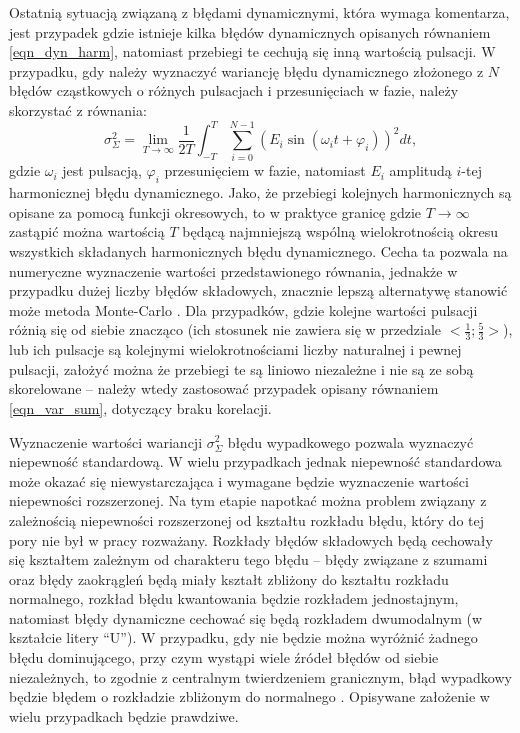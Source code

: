 Ostatnią sytuacją związaną z błędami dynamicznymi, która wymaga komentarza, jest przypadek gdzie istnieje kilka błędów dynamicznych opisanych równaniem \eqref{eqn_dyn_harm}, natomiast przebiegi te cechują się inną wartością pulsacji. W przypadku, gdy należy wyznaczyć wariancję błędu dynamicznego złożonego z $N$ błędów cząstkowych o różnych pulsacjach i przesunięciach w fazie, należy skorzystać z równania:
\begin{equation}
\sigma_{\Sigma}^{2} = \lim _{T \to \infty} \frac{1}{2T} \int _{-T} ^{T} \sum _{i = 0} ^{N -1} \left( E_{i} \sin(\omega_{i} t + \varphi_{i}) \right)^{2} dt \label{eqn_dyn_multi},
\end{equation}
gdzie $\omega_{i}$ jest pulsacją, $\varphi_{i}$ przesunięciem w fazie, natomiast $E_{i}$ amplitudą $i$-tej harmonicznej błędu dynamicznego. Jako, że przebiegi kolejnych harmonicznych są opisane za pomocą funkcji okresowych, to w praktyce granicę gdzie $T \to \infty$ zastąpić można wartością $T$ będącą najmniejszą wspólną wielokrotnością okresu wszystkich składanych harmonicznych błędu dynamicznego. Cecha ta pozwala na numeryczne wyznaczenie wartości przedstawionego równania, jednakże w przypadku dużej liczby błędów składowych, znacznie lepszą alternatywę stanowić może metoda Monte-Carlo \cite{roj_annuncertainty, janssen_montecarlo}. Dla przypadków, gdzie kolejne wartości pulsacji różnią się od siebie znacząco (ich stosunek nie zawiera się w przedziale $<\frac{1}{3};\frac{5}{3}>$), lub ich pulsacje są kolejnymi wielokrotnościami liczby naturalnej i pewnej pulsacji, założyć można że przebiegi te są liniowo niezależne i nie są ze sobą skorelowane -- należy wtedy zastosować przypadek opisany równaniem \eqref{eqn_var_sum}, dotyczący braku korelacji.

Wyznaczenie wartości wariancji $\sigma_{\Sigma}^{2}$ błędu wypadkowego pozwala wyznaczyć niepewność standardową. W wielu przypadkach jednak niepewność standardowa może okazać się niewystarczająca i wymagane będzie wyznaczenie wartości niepewności rozszerzonej. Na tym etapie napotkać można problem związany z zależnością niepewności rozszerzonej od kształtu rozkładu błędu, który do tej pory nie był w pracy rozważany. Rozkłady błędów składowych będą cechowały się kształtem zależnym od charakteru tego błędu -- błędy związane z szumami oraz błędy zaokrągleń będą miały kształt zbliżony do kształtu rozkładu normalnego, rozkład błędu kwantowania będzie rozkładem jednostajnym, natomiast błędy dynamiczne cechować się będą rozkładem dwumodalnym (w kształcie litery \enquote{U}). W przypadku, gdy nie będzie można wyróżnić żadnego błędu dominującego, przy czym wystąpi wiele źródeł błędów od siebie niezależnych, to zgodnie z centralnym twierdzeniem granicznym, błąd wypadkowy będzie błędem o rozkładzie zbliżonym do normalnego \cite{jcgm_guide}. Opisywane założenie w wielu przypadkach będzie prawdziwe.

